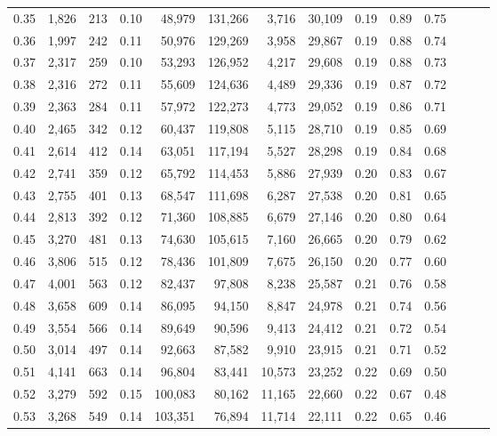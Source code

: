 \begin{tabular}{rrrrrrrrrrrrrr}
0.35 &  1,826 &  213 &  0.10 &   48,979 &  131,266 &   3,716 &  30,109 &  0.19 &  0.89 &      0.75 \\
0.36 &  1,997 &  242 &  0.11 &   50,976 &  129,269 &   3,958 &  29,867 &  0.19 &  0.88 &      0.74 \\
0.37 &  2,317 &  259 &  0.10 &   53,293 &  126,952 &   4,217 &  29,608 &  0.19 &  0.88 &      0.73 \\
0.38 &  2,316 &  272 &  0.11 &   55,609 &  124,636 &   4,489 &  29,336 &  0.19 &  0.87 &      0.72 \\
0.39 &  2,363 &  284 &  0.11 &   57,972 &  122,273 &   4,773 &  29,052 &  0.19 &  0.86 &      0.71 \\
0.40 &  2,465 &  342 &  0.12 &   60,437 &  119,808 &   5,115 &  28,710 &  0.19 &  0.85 &      0.69 \\
0.41 &  2,614 &  412 &  0.14 &   63,051 &  117,194 &   5,527 &  28,298 &  0.19 &  0.84 &      0.68 \\
0.42 &  2,741 &  359 &  0.12 &   65,792 &  114,453 &   5,886 &  27,939 &  0.20 &  0.83 &      0.67 \\
0.43 &  2,755 &  401 &  0.13 &   68,547 &  111,698 &   6,287 &  27,538 &  0.20 &  0.81 &      0.65 \\
0.44 &  2,813 &  392 &  0.12 &   71,360 &  108,885 &   6,679 &  27,146 &  0.20 &  0.80 &      0.64 \\
0.45 &  3,270 &  481 &  0.13 &   74,630 &  105,615 &   7,160 &  26,665 &  0.20 &  0.79 &      0.62 \\
0.46 &  3,806 &  515 &  0.12 &   78,436 &  101,809 &   7,675 &  26,150 &  0.20 &  0.77 &      0.60 \\
0.47 &  4,001 &  563 &  0.12 &   82,437 &   97,808 &   8,238 &  25,587 &  0.21 &  0.76 &      0.58 \\
0.48 &  3,658 &  609 &  0.14 &   86,095 &   94,150 &   8,847 &  24,978 &  0.21 &  0.74 &      0.56 \\
0.49 &  3,554 &  566 &  0.14 &   89,649 &   90,596 &   9,413 &  24,412 &  0.21 &  0.72 &      0.54 \\
0.50 &  3,014 &  497 &  0.14 &   92,663 &   87,582 &   9,910 &  23,915 &  0.21 &  0.71 &      0.52 \\
0.51 &  4,141 &  663 &  0.14 &   96,804 &   83,441 &  10,573 &  23,252 &  0.22 &  0.69 &      0.50 \\
0.52 &  3,279 &  592 &  0.15 &  100,083 &   80,162 &  11,165 &  22,660 &  0.22 &  0.67 &      0.48 \\
0.53 &  3,268 &  549 &  0.14 &  103,351 &   76,894 &  11,714 &  22,111 &  0.22 &  0.65 &      0.46 \\

\end{tabular}
